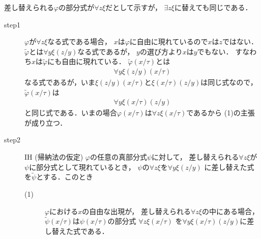 	\begin{metaprf} 差し替えられる$\varphi$の部分式が$\forall z \xi$だとして示すが，
		$\exists z \xi$に替えても同じである．
		\begin{description}
			\item[step1] $\varphi$が$\forall z \xi$なる式である場合，
				$x$は$\varphi$に自由に現れているので$x$は$z$ではない．
				$\widetilde{\varphi}$とは$\forall y \xi(z/y)$なる式であるが，
				$y$の選び方より$x$は$y$でもない．
				すなわち$x$は$\widetilde{\varphi}$にも自由に現れている．
				$\widetilde{\varphi}(x/\tau)$とは
				\begin{align}
					\forall y \xi(z/y)(x/\tau)
				\end{align}
				なる式であるが，いま$\xi(z/y)(x/\tau)$と$\xi(x/\tau)(z/y)$は同じ式なので，
				$\widetilde{\varphi}(x/\tau)$は
				\begin{align}
					\forall y \xi(x/\tau)(z/y)
				\end{align}
				と同じ式である．いまの場合$\varphi(x/\tau)$は$\forall z \xi(x/\tau)$であるから
				(1)の主張が成り立つ．
				
			\item[step2]\mbox{}
				\begin{itembox}[l]{IH (帰納法の仮定)}
					$\varphi$の任意の真部分式$\psi$に対して，
					差し替えられる$\forall z \xi$が$\psi$に部分式として現れているとき，
					$\psi$の$\forall z \xi$を$\forall y \xi(z/y)$ 
					に差し替えた式を$\widetilde{\psi}$とする．このとき
					\begin{description}
						\item[(1)] $\varphi$における$x$の自由な出現が，
							差し替えられる$\forall z \xi$の中にある場合，
							$\widetilde{\psi}(x/\tau)$は$\psi(x/\tau)$の部分式
							$\forall z \xi(x/\tau)$ 
							を$\forall y \xi(x/\tau)(z/y)$に差し替えた式である．
						

\end{description}
\end{itembox}
\end{description}
\end{metaprf}
